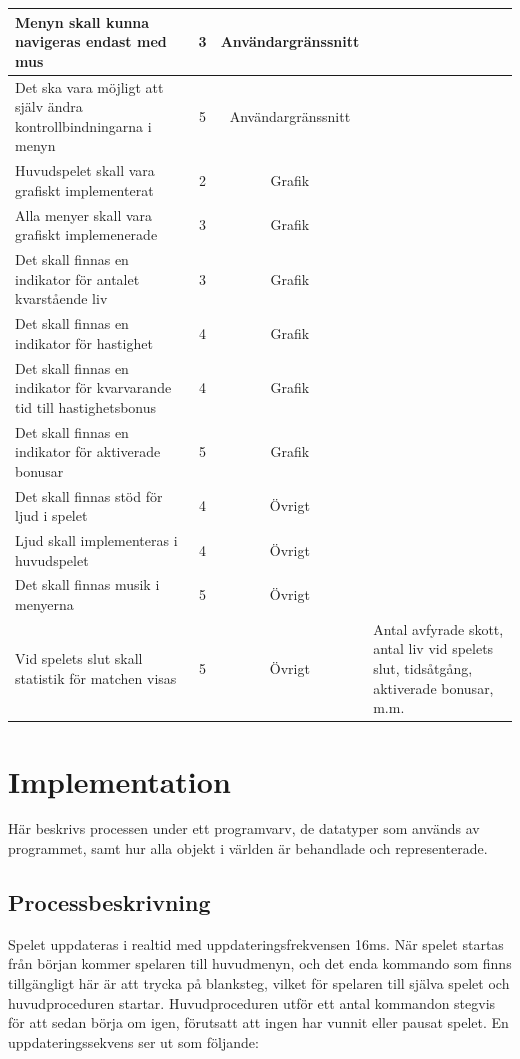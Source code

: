 \documentclass[12pt,a4paper]{article}
\begin{document}
\begin{longtable}{ | p{3.5cm} | c | c | p{3.5cm} | }
	Menyn skall kunna navigeras endast med mus & 3 & Användargränssnitt & \\ \hline
	Det ska vara möjligt att själv ändra kontrollbindningarna i menyn & 5 & Användargränssnitt & \\ \hline
	Huvudspelet skall vara grafiskt implementerat & 2 & Grafik & \\ \hline
	Alla menyer skall vara grafiskt implemenerade & 3 & Grafik & \\ \hline
	Det skall finnas en indikator för antalet kvarstående liv & 3 & Grafik & \\ \hline
	Det skall finnas en indikator för hastighet & 4 & Grafik & \\ \hline
	Det skall finnas en indikator för kvarvarande tid till hastighetsbonus & 4 & Grafik & \\ \hline
	Det skall finnas en indikator för aktiverade bonusar & 5 & Grafik & \\ \hline
	Det skall finnas stöd för ljud i spelet & 4 & Övrigt & \\ \hline
	Ljud skall implementeras i huvudspelet & 4 & Övrigt & \\ \hline
	Det skall finnas musik i menyerna & 5 & Övrigt & \\ \hline
	Vid spelets slut skall statistik för matchen visas & 5 & Övrigt & Antal avfyrade skott, antal liv vid spelets slut, tidsåtgång, aktiverade bonusar, m.m.\\ \hline
\end{longtable}

\section{Implementation}
Här beskrivs processen under ett programvarv, de datatyper som används av programmet, samt hur alla objekt i världen är behandlade och representerade.

\subsection{Processbeskrivning}
Spelet uppdateras i realtid med uppdateringsfrekvensen 16ms. När spelet startas från början kommer spelaren till huvudmenyn, och det enda kommando som finns tillgängligt här är att trycka på blanksteg, vilket för spelaren till själva spelet och huvudproceduren startar. Huvudproceduren utför ett antal kommandon stegvis för att sedan börja om igen, förutsatt att ingen har vunnit eller pausat spelet. En uppdateringssekvens ser ut som följande:
\end{document}
